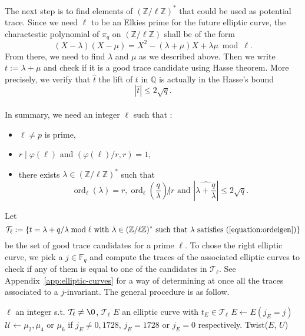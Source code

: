 \documentclass[12pt]{article}
\theoremstyle{plain}
\theoremstyle{definition}
\DeclareMathOperator{\order}{ord} %
\def\Q{\ensuremath{\mathbb{Q}}}
\def\Z{\ensuremath{\mathbb{Z}}}
\def\F{\ensuremath{\mathbb{F}}}
\newcounter{algorithm}
\begin{document}
The next step is to find elements of $(\Z/\ell\Z)^{\ast}$ that could be used as
potential trace. Since we need $\ell$ to be an Elkies prime for the future 
elliptic curve, the charactestic polynomial of $\pi_q$ on $(\Z/\ell\Z)$ shall 
be of the form
\begin{equation}
(X - \lambda)(X - \mu) = X^2 - (\lambda + \mu)X + \lambda\mu \bmod \ell.
\end{equation}
From there, we need to find $\lambda$ and $\mu$ as we described above. Then we 
write $t:=\lambda+\mu$ and check if it is a good trace candidate using 
Hasse theorem. More precisely, we verify that $\widehat{t}$ the lift of $t$ in
$\Q$ is actually in the Hasse's bound
\begin{equation}
|\widehat{t}| \leq 2\sqrt{q}.
\end{equation}\\
In summary, we need an integer $\ell$ such that :
\begin{itemize}
    \item $\ell\neq p$ is prime,
    \item $r\mid\varphi(\ell)$ and $(\varphi(\ell)/r,r)=1$,
    \item there exists $\lambda\in(\Z/\ell\Z)^{\ast}$ such that 
\begin{equation}
\label{equation:ordeigen}
\order_\ell(\lambda) = r,\order_\ell(\dfrac{q}{\lambda}) \not| r\text{ and }|\widehat{\lambda + \dfrac{q}{\lambda}}| \leq 2\sqrt{q}.
\end{equation}
\end{itemize}

Let
\[
\mathcal{T}_\ell := \lbrace{t = \lambda + q/\lambda \bmod \ell \text{ with } \lambda\in(\Z/\ell\Z)^{\ast}
\text{ such that } \lambda \text{ satisfies 
}(\ref{equation:ordeigen})}\rbrace
\]
be the set of good trace candidates for a prime $\ell$.
To chose the right elliptic curve, we pick a $j\in\F_q$ and compute
the traces of the associated elliptic curves to check if any of them
is equal to one of the candidates in $\mathcal{T}_\ell$. See
Appendix~\ref{app:elliptic-curves} for a way of determining at once
all the traces associated to a $j$-invariant. The general procedure is as
follow.

\begin{algorithm}
    \label{algorithm:selectell}
    \begin{algorithmic}[1]
    \REQUIRE $\ell$ an integer s.t. $\mathcal{T}_\ell\neq\O$, $\mathcal{T}_\ell$ 
    \ENSURE $E$ an elliptic curve with $t_E\in\mathcal{T}_\ell$
    \FOR{$j\in\F_q$}
        \STATE $E \leftarrow E(j_E = j)$ 
        \STATE $\mathcal{U} \leftarrow \mu_2, \mu_4\text{ or }\mu_6$ if 
$j_E\neq0,1728$, $j_E=1728$ or $j_E=0$ respectively.
                    \RETURN Twist($E$, $U$)
                \ENDIF
            \ENDFOR
    \ENDFOR
    \end{algorithmic}
\end{algorithm}
\end{document}
